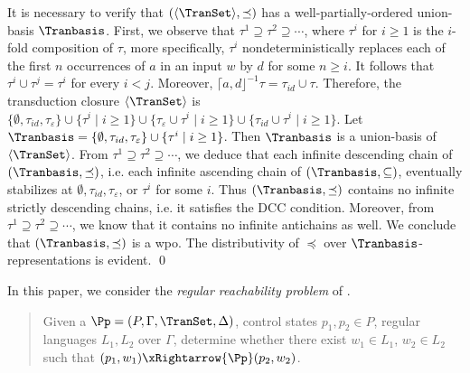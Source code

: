 \begin{example}
It is necessary to verify that $(\langle \TranSet \rangle, \preceq)$ has a well-partially-ordered union-basis $\Tranbasis$. First, we observe that $\tau^1 \supseteq \tau^2 \supseteq \cdots$, where $\tau^i$ for $i \ge 1$ is the $i$-fold composition of $\tau$, more specifically, $\tau^i$ nondeterministically replaces each of the first $n $ occurrences of $a$ in an input $w$ by $d$ for some $n \ge i$. It follows that $\tau^i \cup \tau^j = \tau^i$ for every $i < j$.
Moreover, $\lceil a, d \rfloor^{-1} \tau = \tau_{id} \cup \tau$. Therefore, the transduction closure $\langle \TranSet \rangle$ is $\{\emptyset, \tau_{id}, \tau_\varepsilon\} \cup \{\tau^i \mid i \ge 1\} \cup \{\tau_{\varepsilon} \cup \tau^i \mid i \ge 1\} \cup \{\tau_{id} \cup \tau^i \mid i \ge 1\}$. Let $\Tranbasis = \{\emptyset, \tau_{id}, \tau_\varepsilon\} \cup \{\tau^i \mid i \ge 1\}$. Then $\Tranbasis$ is a union-basis of $\langle \TranSet \rangle$. 
%
From $\tau^1 \supseteq \tau^2 \supseteq \cdots$, we deduce that each infinite descending chain of $(\Tranbasis, \preceq)$, i.e. each infinite ascending chain of $(\Tranbasis, \subseteq)$, eventually stabilizes at $\emptyset, \tau_{id}, \tau_\varepsilon$, or $\tau^i$ for some $i$. Thus $(\Tranbasis, \preceq)$ contains no infinite strictly descending chains, i.e. it satisfies the DCC condition. Moreover, from $\tau^1 \supseteq \tau^2 \supseteq \cdots$, we know that it contains no infinite antichains as well. We conclude that $(\Tranbasis, \preceq)$ is a wpo. The distributivity of $\preceq$ over $\Tranbasis$-representations is evident. \qed
%
\end{example}

In this paper, we consider the \emph{regular reachability problem} of {\WOTrPDS}.
\begin{quote} 
	Given a {\WOTrPDS} $\Pp = (P, \Gamma, \TranSet, \Delta)$, control states $p_1, p_2 \in P$, regular languages $L_1, L_2$ over $\Gamma$, determine whether there exist %
	$w_1 \in L_1$, $w_2 \in L_2$ such that $(p_1, w_1) \xRightarrow{\Pp} (p_2, w_2)$.
\end{quote}
%

